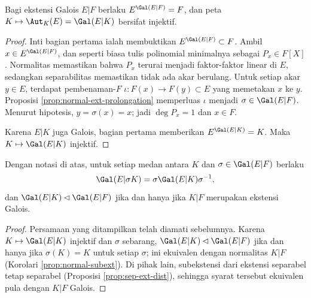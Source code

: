 \begin{lemma}\label{prop:invariant-field-is-F}
	Bagi ekstensi Galois $E|F$ berlaku $E^{\Gal(E|F)}=F$, dan peta $K\mapsto\Aut_K(E)=\Gal(E|K)$ bersifat injektif.
\end{lemma}
\begin{proof}
	Inti bagian pertama ialah membuktikan $E^{\Gal(E|F)}\subset F$. Ambil $x\in E^{\Gal(E|F)}$, dan seperti biasa tulis polinomial minimalnya sebagai $P_x\in F[X]$. Normalitas memastikan bahwa $P_x$ terurai menjadi faktor-faktor linear di $E$, sedangkan separabilitas memastikan tidak ada akar berulang. Untuk setiap akar $y\in E$, terdapat pembenaman-$F$ $\iota:F(x)\to F(y)\subset E$ yang memetakan $x$ ke $y$. Proposisi \ref{prop:normal-ext-prolongation} memperluas $\iota$ menjadi $\sigma\in\Gal(E|F)$. Menurut hipotesis, $y=\sigma(x)=x$; jadi $\deg P_x=1$ dan $x\in F$.
	
	Karena $E|K$ juga Galois, bagian pertama memberikan $E^{\Gal(E|K)}=K$. Maka $K\mapsto\Gal(E|K)$ injektif.
\end{proof}

\begin{lemma}\label{prop:invariant-field-transport}
	Dengan notasi di atas, untuk setiap medan antara $K$ dan $\sigma\in\Gal(E|F)$ berlaku
	\[ \Gal(E|\sigma K) = \sigma \Gal(E|K) \sigma^{-1}, \]
	dan $\Gal(E|K)\lhd\Gal(E|F)$ jika dan hanya jika $K|F$ merupakan ekstensi Galois.
\end{lemma}
\begin{proof}
	Persamaan yang ditampilkan telah diamati sebelumnya. Karena $K\mapsto\Gal(E|K)$ injektif dan $\sigma$ sebarang, $\Gal(E|K)\lhd\Gal(E|F)$ jika dan hanya jika $\sigma(K)=K$ untuk setiap $\sigma$; ini ekuivalen dengan normalitas $K|F$ (Korolari \ref{prop:normal-subext}). Di pihak lain, subekstensi dari ekstensi separabel tetap separabel (Proposisi \ref{prop:sep-ext-dist}), sehingga syarat tersebut ekuivalen pula dengan $K|F$ Galois.
\end{proof}


